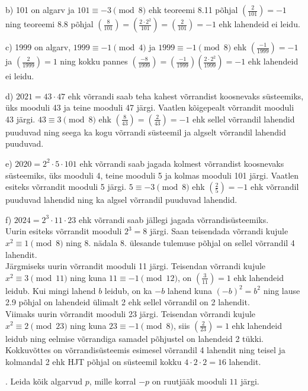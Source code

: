 \documentclass[a4paper, 10pt]{article}
\newcommand{\leg}[2]{\left(\frac{#1}{#2}\right)}
\begin{document}
b) 101 on algarv ja $101\equiv-3\pmod8$ ehk teoreemi 8.11 põhjal $\leg {2}{101}=-1$ ning teoreemi 8.8 põhjal $\leg {8}{101}=\leg {2\cdot2^2}{101}=\leg {2}{101}=-1$ ehk lahendeid ei leidu.

c) 1999 on algarv, $1999\equiv-1\pmod4$ ja $1999\equiv-1\pmod8$ ehk $\leg {-1}{1999}=-1$ ja $\leg {2}{1999}=1$ ning kokku pannes $\leg{-8}{1999}=\leg{-1}{1999}\leg{2\cdot2^2}{1999}=-1$ ehk lahendeid ei leidu.

d) $2021=43\cdot47$ ehk võrrandi saab teha kahest võrrandist koosnevaks süsteemiks, üks mooduli 43 ja teine mooduli 47 järgi. Vaatlen kõigepealt võrrandit mooduli 43 järgi. $43\equiv3\pmod8$ ehk \mbox{$\leg8{43}=\leg2{43}=-1$} ehk sellel võrrandil lahendid puuduvad ning seega ka kogu võrrandi süsteemil ja algselt võrrandil lahendid puuduvad.

e) $2020=2^2\cdot5\cdot101$ ehk võrrandi saab jagada kolmest võrrandist koosnevaks süsteemiks, üks mooduli 4, teine mooduli 5 ja kolmas mooduli 101 järgi. Vaatlen esiteks võrrandit mooduli 5 järgi. $5\equiv-3\pmod8$ ehk $\leg 25=-1$ ehk võrrandil puuduvad lahendid ning ka algsel võrrandil puuduvad lahendid.

f) $2024=2^3\cdot11\cdot23$ ehk võrrandi saab jällegi jagada võrrandisüsteemiks.\\
Uurin esiteks võrrandit mooduli $2^3=8$ järgi. Saan teisendada võrrandi kujule $x^2\equiv1\pmod8$ ning 8. nädala 8. ülesande tulemuse põhjal on sellel võrrandil 4 lahendit.\\
Järgmiseks uurin võrrandit mooduli 11 järgi. Teisendan võrrandi kujule $x^2\equiv3\pmod{11}$ ning kuna $11\equiv-1\pmod{12}$, on $\leg 3{11}=1$ ehk lahendeid leidub. Kui mingi lahend $b$ leidub, on ka $-b$ lahend kuna $(-b)^2=b^2$ ning lause 2.9 põhjal on lahendeid ülimalt 2 ehk sellel võrrandil on 2 lahendit.\\
Viimaks uurin võrrandit mooduli 23 järgi. Teisendan võrrandi kujule $x^2\equiv2\pmod{23}$ ning kuna \mbox{$23\equiv-1\pmod8$}, siis $\leg {2}{23}=1$ ehk lahendeid leidub ning eelmise võrrandiga samadel põhjustel on lahendeid 2 tükki.\\
Kokkuvõttes on võrrandisüsteemis esimesel võrrandil 4 lahendit ning teisel ja kolmandal 2 ehk HJT põhjal on süsteemil kokku $4\cdot2\cdot2=16$ lahendit.

\bigskip

. Leida kõik algarvud $p$, mille korral $-p$ on ruutjääk mooduli $11$ järgi. 

\bigskip
\end{document}
